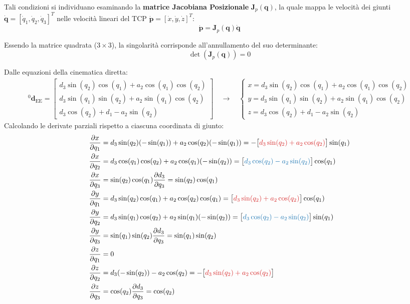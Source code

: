 \documentclass[11pt, a4paper]{report}
\begin{document}
Tali condizioni si individuano esaminando la \textbf{matrice Jacobiana Posizionale} $\bm{J}_p(\bm{q})$, la quale mappa le velocità dei giunti $\bm{\dot{q}} = [\dot{q}_1, \dot{q}_2, \dot{q}_3]^T$ nelle velocità lineari del TCP $\bm{\dot{p}} = [\dot{x}, \dot{y}, \dot{z}]^T$:
\[
    \bm{\dot{p}} = \bm{J}_p(\bm{q}) \bm{\dot{q}}
\]

Essendo la matrice quadrata ($3 \times 3$), la singolarità corrisponde all'annullamento del suo determinante:
\[
    \det(\bm{J}_p(\bm{q})) = 0
\]

Dalle equazioni della cinematica diretta:
\begin{align*}
    {}^{0}\mathbf{d}_{\text{EE}} =
    \begin{bmatrix}
        d_3 \sin(q_2) \cos(q_1) + a_2 \cos(q_1) \cos(q_2)\\
        d_3 \sin(q_1) \sin(q_2) + a_2 \sin(q_1) \cos(q_2) \\
        d_3 \cos(q_2) + d_1 - a_2 \sin(q_2)
    \end{bmatrix}
    \quad\longrightarrow\quad
    \begin{cases}
        x = d_3 \sin(q_2) \cos(q_1) + a_2 \cos(q_1) \cos(q_2)\\
        y = d_3 \sin(q_1) \sin(q_2) + a_2 \sin(q_1) \cos(q_2) \\
        z = d_3 \cos(q_2) + d_1 - a_2 \sin(q_2)
    \end{cases}
\end{align*}
Calcolando le derivate parziali rispetto a ciascuna coordinata di giunto:
\begin{align*}
    \frac{\partial x}{\partial q_1} &= d_{3}\sin(q_{2})(-\sin(q_{1})) + a_2\cos(q_{2})(-\sin(q_{1})) = -\bigl[\textcolor{mathRed}{d_{3}\sin(q_{2}) + a_{2}\cos(q_{2})}\bigr]\sin(q_{1})\\
    \frac{\partial x}{\partial q_2} &= d_{3}\cos(q_{1})\cos(q_{2}) + a_{2}\cos(q_{1})(-\sin(q_{2})) = \bigl[\textcolor{mathBlue}{d_{3}\cos(q_{2}) - a_{2}\sin(q_{2})}\bigr]\cos(q_{1}) \\
    \frac{\partial x}{\partial q_3} &= \sin(q_{2})\cos(q_{1})\frac{\partial d_3}{\partial q_3} = \sin(q_{2})\cos(q_{1})\\
    \frac{\partial y}{\partial q_1} &= d_{3}\sin(q_{2})\cos(q_{1}) + a_{2}\cos(q_{2})\cos(q_{1}) = \bigl[\textcolor{mathRed}{d_{3}\sin(q_{2}) + a_{2}\cos(q_{2})}\bigr]\cos(q_{1}) \\
    \frac{\partial y}{\partial q_2} &= d_3 \sin(q_1) \cos(q_2) + a_2 \sin(q_1) (-\sin(q_2)) = \bigl[\textcolor{mathBlue}{d_{3}\cos(q_{2}) - a_{2}\sin(q_{2})}\bigr] \sin(q_1) \\
    \frac{\partial y}{\partial q_3} &= \sin(q_{1})\sin(q_{2})\frac{\partial d_3}{\partial q_3} = \sin(q_{1})\sin(q_{2}) \\
    \frac{\partial z}{\partial q_1} &= 0\\
    \frac{\partial z}{\partial q_2} &= d_{3}(-\sin(q_{2})) - a_{2}\cos(q_{2}) = -\bigl[\textcolor{mathRed}{d_{3}\sin(q_{2}) + a_{2}\cos(q_{2})}\bigr]\\
    \frac{\partial z}{\partial q_3} &= \cos(q_{2})\frac{\partial d_3}{\partial q_3} = \cos(q_{2})
\end{align*}
\end{document}
